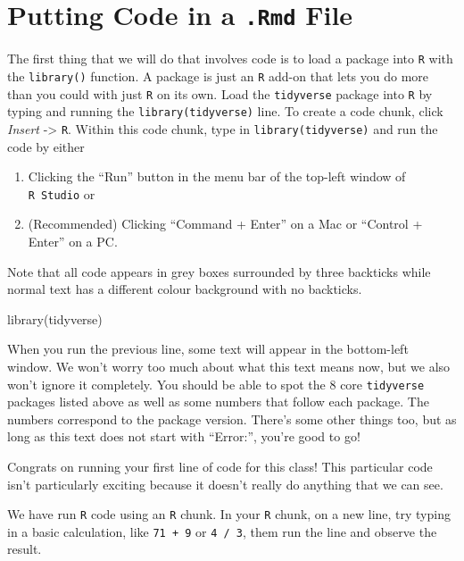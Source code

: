 \documentclass[
]{book}
\newenvironment{Shaded}{\begin{snugshade}}{\end{snugshade}}
\newcommand{\FunctionTok}[1]{\textcolor[rgb]{0.00,0.00,0.00}{#1}}
\newcommand{\NormalTok}[1]{#1}
\begin{document}
\hypertarget{putting-code-in-a-.rmd-file}{%
\section{\texorpdfstring{Putting Code in a \texttt{.Rmd} File}{Putting Code in a .Rmd File}}\label{putting-code-in-a-.rmd-file}}

The first thing that we will do that involves code is to load a package into \texttt{R} with the \texttt{library()} function. A package is just an \texttt{R} add-on that lets you do more than you could with just \texttt{R} on its own. Load the \texttt{tidyverse} package into \texttt{R} by typing and running the \texttt{library(tidyverse)} line. To create a code chunk, click \emph{Insert} -\textgreater{} \texttt{R}. Within this code chunk, type in \texttt{library(tidyverse)} and run the code by either

\begin{enumerate}
\def\labelenumi{\arabic{enumi}.}
\item
  Clicking the ``Run'' button in the menu bar of the top-left window of \texttt{R\ Studio} or
\item
  (Recommended) Clicking ``Command + Enter'' on a Mac or ``Control + Enter'' on a PC.
\end{enumerate}

Note that all code appears in grey boxes surrounded by three backticks while normal text has a different colour background with no backticks.

\begin{Shaded}
\begin{Highlighting}[]
\FunctionTok{library}\NormalTok{(tidyverse)}
\end{Highlighting}
\end{Shaded}

When you run the previous line, some text will appear in the bottom-left window. We won't worry too much about what this text means now, but we also won't ignore it completely. You should be able to spot the 8 core \texttt{tidyverse} packages listed above as well as some numbers that follow each package. The numbers correspond to the package version. There's some other things too, but as long as this text does not start with ``Error:'', you're good to go!

Congrats on running your first line of code for this class! This particular code isn't particularly exciting because it doesn't really do anything that we can see.

We have run \texttt{R} code using an \texttt{R} chunk. In your \texttt{R} chunk, on a new line, try typing in a basic calculation, like \texttt{71\ +\ 9} or \texttt{4\ /\ 3}, them run the line and observe the result.
\end{document}
